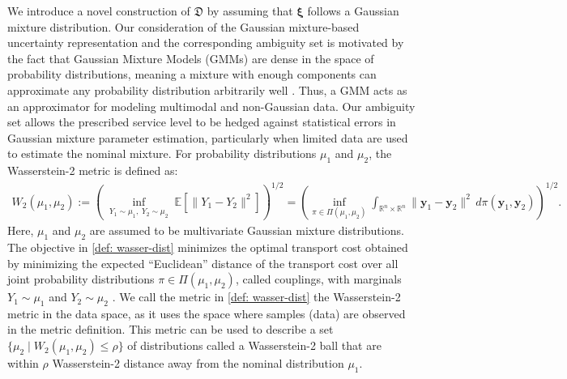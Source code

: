 \documentclass[opre,sglanonrev]{informs4}
\newcommand{\mfD}{\mathfrak{D}}
\newcommand{\mbR}{\mathbb R}
\newcommand{\mbE}{\mathbb{E}}
\newcommand{\bxi}{\bm{\xi}}
\newcommand{\by}{\bm{y}}
\begin{document}
We introduce a novel construction of $\mfD$ by assuming that $\bxi$ follows a Gaussian mixture distribution. Our consideration of the Gaussian mixture-based uncertainty representation and the corresponding ambiguity set is motivated by the fact that Gaussian Mixture Models (GMMs) are dense in the space of probability distributions, meaning a mixture with enough components can approximate any probability distribution arbitrarily well \cite{lindsay1995mixture, li1999mixture}. 
Thus, a GMM acts as an approximator for modeling multimodal and non-Gaussian data. 
Our ambiguity set allows the prescribed service level to be hedged against statistical errors in Gaussian mixture parameter estimation, particularly when limited data are used to estimate the nominal mixture. 
For probability distributions $\mu_1$ and $\mu_2$, the Wasserstein-2 metric \cite{vaserstein1969markov} is defined as:
\begin{align}\label{def: wasser-dist}
W_2(\mu_1,\mu_2)
:=
\left(
\inf_{\substack{Y_1\sim\mu_1,\;Y_2\sim\mu_2}}
\mbE\!\left[\|Y_1-Y_2\|^2\right]
\right)^{1/2}
=
\left(
\inf_{\pi\in\Pi(\mu_1,\mu_2)}
\int_{\mbR^n\times\mbR^n}
\|\by_1-\by_2\|^2\,d\pi(\by_1,\by_2)
\right)^{1/2}.
\end{align}
Here, $\mu_1$ and $\mu_2$ are assumed to be multivariate Gaussian mixture distributions. 
The objective in \eqref{def: wasser-dist} minimizes the optimal transport cost obtained by minimizing the expected ``Euclidean'' distance of the transport cost over all joint probability distributions $\pi\in\Pi(\mu_1, \mu_2)$, called couplings, with marginals $Y_1\sim\mu_1$ and $Y_2\sim\mu_2$ \cite{monge1781memoire,kantorovich1942translocation,kantorovich_rubinstein1958,villani2008optimal}. 
We call the metric in \eqref{def: wasser-dist} the Wasserstein-2 metric in the data space, as it uses the space where samples (data) are observed in the metric definition. 
This metric can be used to describe a set $\{\mu_2 \;|\; W_2(\mu_1,\mu_2) \leq \rho\}$ of distributions called a Wasserstein-2 ball that are within $\rho$ Wasserstein-2 distance away from the nominal distribution $\mu_1$.  
\end{document}
